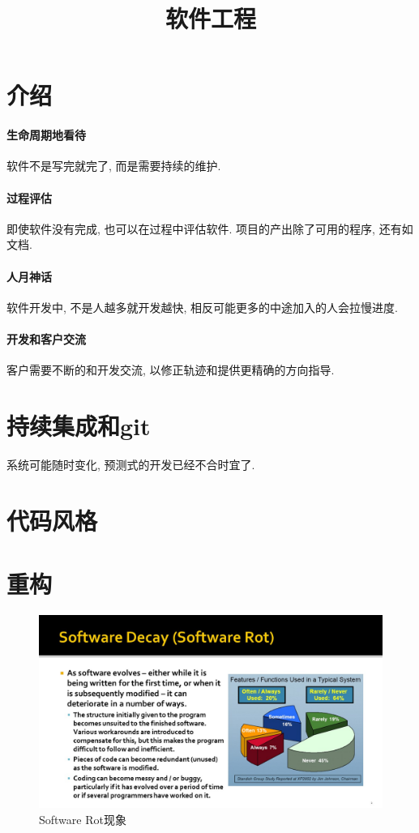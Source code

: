 \documentclass{ctexart}
\title{软件工程}
\begin{document}
\maketitle

\section{介绍}
\paragraph{生命周期地看待} 软件不是写完就完了, 而是需要持续的维护.
\paragraph{过程评估} 即使软件没有完成, 也可以在过程中评估软件.
 项目的产出除了可用的程序, 还有如文档.
\paragraph{人月神话} 软件开发中, 不是人越多就开发越快, 相反可能更多的中途加入的人会拉慢进度.
\paragraph{开发和客户交流} 客户需要不断的和开发交流, 以修正轨迹和提供更精确的方向指导.

\section{持续集成和git}
    系统可能随时变化, 预测式的开发已经不合时宜了.

\section{代码风格}


\pagebreak
\section{重构}
    \begin{figure}[ht!]
        \centering
        \includegraphics[width=\textwidth, height=\textheight, keepaspectratio]{refactor-1.jpg}
        \caption{Software Rot现象}
    \end{figure}
\end{document}
